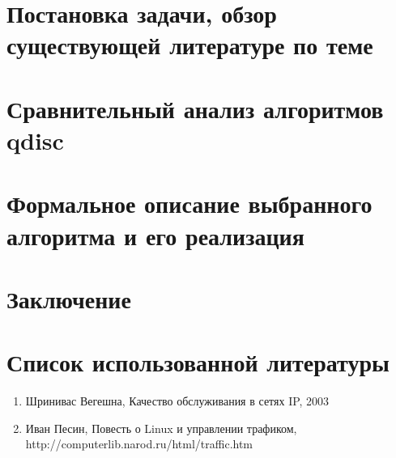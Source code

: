 \documentclass[14pt] {ncc}
\begin{document}
%	

\section{Постановка задачи, обзор существующей литературе по теме}
	

\section{Сравнительный анализ алгоритмов qdisc}
	

\section{Формальное описание выбранного алгоритма и его реализация}

\section{Заключение}

\section{Список использованной литературы}
	\begin{enumerate}
		\item Шринивас Вегешна, Качество обслуживания в сетях IP, 2003
		\item Иван Песин, Повесть о Linux и управлении трафиком, \\ http://computerlib.narod.ru/html/traffic.htm
	\end{enumerate}
\end{document}

